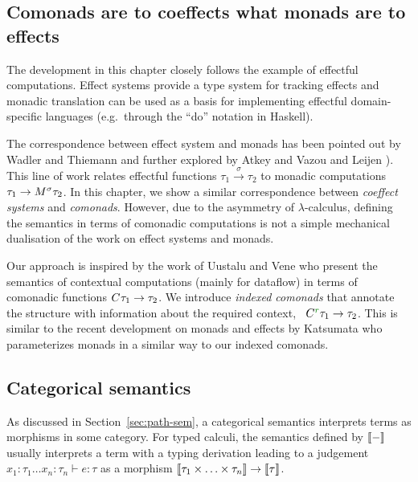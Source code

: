 
\subsection{Comonads are to coeffects what monads are to effects}

The development in this chapter closely follows the example of effectful computations.
Effect systems provide a type system for tracking effects and monadic translation can be used as
a basis for implementing effectful domain-specific languages (e.g.~through the ``do'' notation in
Haskell).

The correspondence between effect system and monads has been pointed out by Wadler and Thiemann
\cite{monads-effects-marriage} and further explored by Atkey \cite{monads-parameterised-notions}
and Vazou and Leijen \cite{monads-effects-remarriage}). This line of work relates effectful
functions $\tau_1 \xrightarrow{\sigma} \tau_2$ to monadic computations
$\tau_1 \rightarrow M^{\sigma}\tau_2$. In this chapter, we show a similar correspondence between
\emph{coeffect systems} and \emph{comonads}. However, due to the asymmetry of $\lambda$-calculus,
defining the semantics in terms of comonadic computations is not a simple mechanical dualisation
of the work on effect systems and monads.

Our approach is inspired by the work of Uustalu and Vene \cite{comonads-notions} who present the
semantics of contextual computations (mainly for dataflow) in terms of comonadic functions
$C^{}\tau_1 \rightarrow \tau_2$. We introduce \emph{indexed comonads} that annotate the structure
with information about the required context, \ie~$\ctyp{\cclrd{r}} \tau_1 \rightarrow \tau_2$.
This is similar to the recent development on monads and effects by Katsumata \cite{monads-parametric}
who parameterizes monads in a similar way to our indexed comonads.


\subsection{Categorical semantics}

As discussed in Section~\ref{sec:path-sem}, a categorical semantics interprets terms as morphisms
in some category. For typed calculi, the semantics defined by $\llbracket - \rrbracket$ usually interprets a term
with a typing derivation leading to a judgement $x_1 \!:\! \tau_1 \ldots x_n \!:\! \tau_n \vdash e: \tau$
as a morphism $\llbracket \tau_1 \times \ldots \times \tau_n \rrbracket \rightarrow \llbracket \tau \rrbracket$.

